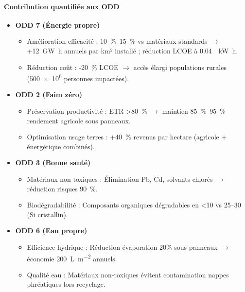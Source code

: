 \documentclass[12pt, a4paper]{article}
\begin{document}
\paragraph{Contribution quantifiée aux ODD}
\begin{itemize}
    \item \textbf{ODD 7 (Énergie propre)}
    \begin{itemize}
        \item Amélioration efficacité : \SIrange{+10}{+15}{\percent} vs matériaux standards $\rightarrow$ +\SI{12}{\giga\watt\hour} annuels par km² installé ; réduction LCOE à \SI{0.04}{\per\kilo\watt\hour}.
        \item Réduction coût : -\SI{20}{\percent} LCOE $\rightarrow$ accès élargi populations rurales (\num{500e6} personnes impactées).
\end{itemize}
    
    \item \textbf{ODD 2 (Faim zéro)}
    \begin{itemize}
        \item Préservation productivité : ETR \SI{>80}{\percent} $\rightarrow$ maintien \SIrange{85}{95}{\percent} rendement agricole sous panneaux.
        \item Optimisation usage terres : +\SI{40}{\percent} revenus par hectare (agricole + énergétique combinés).
\end{itemize}
    
    \item \textbf{ODD 3 (Bonne santé)}
    \begin{itemize}
        \item Matériaux non toxiques : Élimination Pb, Cd, solvants chlorés $\rightarrow$ réduction risques \SI{90}{\percent}.
        \item Biodégradabilité : Composants organiques dégradables en \SI{<10}{\year} vs \SIrange{25}{30}{\year} (Si cristallin).
\end{itemize}
    
    \item \textbf{ODD 6 (Eau propre)}
    \begin{itemize}
        \item Efficience hydrique : Réduction évaporation 20\% sous panneaux $\rightarrow$ économie \SI{200}{\liter\per\meter\squared} annuels.
        \item Qualité eau : Matériaux non-toxiques évitent contamination nappes phréatiques lors recyclage.
    \end{itemize}
    

\end{itemize}
\end{document}
